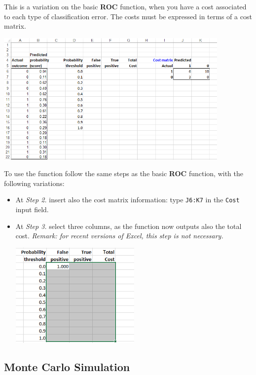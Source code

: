 \documentclass[12pt]{article}
\begin{document}
This is a variation on the basic \textbf{ROC} function, when you have a cost associated to each type of classification error. The costs must be expressed in terms of a cost matrix.

\medskip

\centerline{\includegraphics[width=4.5in]{figures/roccost1.png}}

\medskip

To use the function follow the same steps as the basic \textbf{ROC} function, with the following variations:
\begin{itemize}
\item At \textit{Step 2.} insert also the cost matrix information: type \texttt{J6:K7} in the \texttt{Cost} input field.
\item At \textit{Step 3.} select three columns, as the function now outputs also the total cost. \textit{Remark: for recent versions of Excel, this step is not necessary.}
\medskip

\centerline{\includegraphics[width=2.5in]{figures/roccost2.png}}

\medskip
\end{itemize}
\medskip

\subsection{Monte Carlo Simulation}
\end{document}
